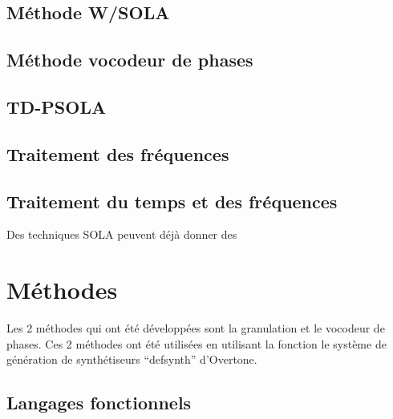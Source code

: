 \documentclass[letterpaper]{article}
\begin{document}
\subsection{Méthode W/SOLA}

\subsection{Méthode vocodeur de phases}

\subsection{TD-PSOLA}

\subsection{Traitement des fréquences}

\subsection{Traitement du temps et des fréquences}
Des techniques SOLA peuvent déjà donner des 

\section{Méthodes}

Les 2 méthodes qui ont été développées sont la granulation et le vocodeur de phases.
Ces 2 méthodes ont été utilisées en utilisant la fonction le système de génération de
synthétiseurs ``defsynth'' d'Overtone.

\subsection{Langages fonctionnels}

\end{document}
